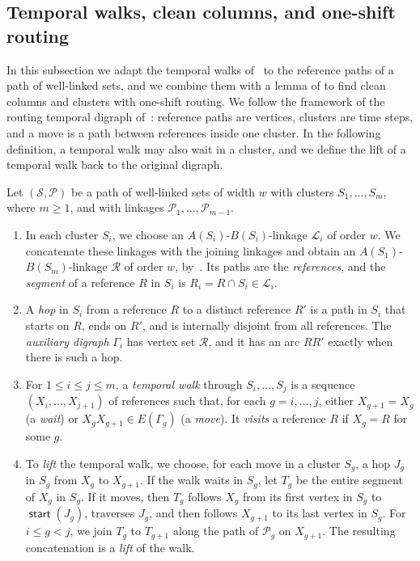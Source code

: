 \documentclass[fontsize=12pt,leading=14pt]{fullpaper}
\DeclareMathOperator{\st}{\mathsf{start}}
\newcommand{\Lcal}{\mathcal{L}}
\newcommand{\Pcal}{\mathcal{P}}
\newcommand{\Rcal}{\mathcal{R}}
\newcommand{\Scal}{\mathcal{S}}
\newcounter{step}
\begin{document}
\subsection{Temporal walks, clean columns, and one-shift routing}\label{sec:s3-prep}

In this subsection we adapt the temporal walks of~\cite{HKMM26a} to the reference paths of a path of well-linked sets, and we combine them with a lemma of \textcite{ReedRST96} to find clean columns and clusters with one-shift routing.
We follow the framework of the routing temporal digraph of~\cite[definitions~6.1--6.3]{HKMM26a}: reference paths are vertices, clusters are time steps, and a move is a path between references inside one cluster.
In the following definition, a temporal walk may also wait in a cluster, and we define the lift of a temporal walk back to the original digraph.

\begin{definition}\label{def:s3-temporal}
  Let $(\Scal,\Pcal)$ be a path of well-linked sets of width $w$ with clusters $S_1,\dots,S_m$, where $m\ge1$, and with linkages $\Pcal_1,\dots,\Pcal_{m-1}$.
  \begin{enumerate}[label=\textnormal{(\roman*)}]
    \item\label{item:s3-refs} In each cluster $S_i$, we choose an $A(S_i)$-$B(S_i)$-linkage $\Lcal_i$ of order $w$.
      We concatenate these linkages with the joining linkages and obtain an $A(S_1)$-$B(S_m)$-linkage $\Rcal$ of order $w$, by~.
      Its paths are the \emph{references}, and the \emph{segment} of a reference $R$ in $S_i$ is $R_i=R\cap S_i\in\Lcal_i$.
    \item\label{item:s3-hops} A \emph{hop} in $S_i$ from a reference $R$ to a distinct reference $R'$ is a path in $S_i$ that starts on $R$, ends on $R'$, and is internally disjoint from all references.
      The \emph{auxiliary digraph} $\Gamma_i$ has vertex set $\Rcal$, and it has an arc $RR'$ exactly when there is such a hop.
    \item\label{item:s3-walks} For $1\le i\le j\le m$, a \emph{temporal walk} through $S_i,\dots,S_j$ is a sequence $(X_i,\dots,X_{j+1})$ of references such that, for each $g=i,\dots,j$, either $X_{g+1}=X_g$ (a \emph{wait}) or $X_gX_{g+1}\in E(\Gamma_g)$ (a \emph{move}).
      It \emph{visits} a reference $R$ if $X_g=R$ for some $g$.
    \item\label{item:s3-lift} To \emph{lift} the temporal walk, we choose, for each move in a cluster $S_g$, a hop $J_g$ in $S_g$ from $X_g$ to $X_{g+1}$.
      If the walk waits in $S_g$, let $T_g$ be the entire segment of $X_g$ in $S_g$.
      If it moves, then $T_g$ follows $X_g$ from its first vertex in $S_g$ to $\st(J_g)$, traverses $J_g$, and then follows $X_{g+1}$ to its last vertex in $S_g$.
      For $i\le g<j$, we join $T_g$ to $T_{g+1}$ along the path of $\Pcal_g$ on $X_{g+1}$.
      The resulting concatenation is a \emph{lift} of the walk.
  \end{enumerate}
\end{definition}
\end{document}
